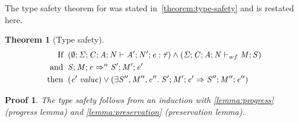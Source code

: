 \documentclass[showabstract,showacknowledgments,showpreface,showdedication]{iuphd}
\newtheorem{theorem}{Theorem}[section]
\theoremstyle{nonumberplain}
\newtheorem{nproof}{Proof}
\begin{document}

The type safety theorem for \ourcalc{} was stated in~\ref{theorem:type-safety} and is restated here.

\begin{theorem}[Type safety]
\begin{displaymath}
  \begin{aligned}
  \text{If} \;\; & (\emptyset;\mathit{\Sigma};\mathit{C};\mathit{A};\mathit{N} \vdash \mathit{A}';\mathit{N}';\mathit{e} : \mathit{\hat{\tau}}) \wedge
                   (\mathit{\Sigma};\mathit{C};\mathit{A};\mathit{N} \vdash_{wf} \mathit{M};\mathit{S}) \\
  \text{and} \;\; & \mathit{S};\mathit{M};\mathit{e} \Rightarrow^n \mathit{S}';\mathit{M}';\mathit{e}' \\
  \text{then} \;\; & (\mathit{e}' \; \mathit{value}) \vee 
                     (\exists \mathit{S}'', \mathit{M}'', \mathit{e}'' . \; \mathit{S}';\mathit{M}';\mathit{e}' \Rightarrow \mathit{S}'';\mathit{M}'';\mathit{e}'')
  \end{aligned}
  \end{displaymath}  
\end{theorem}

\begin{nproof}
  The type safety follows from an induction with
  \ref{lemma:progress} (progress lemma) and \ref{lemma:preservation} (preservation lemma).
\end{nproof}





%



\end{document}
